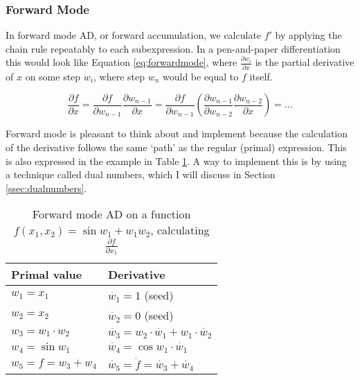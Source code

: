 \documentclass{article}
\begin{document}
            \subsubsection{Forward Mode}
                In forward mode AD, or forward accumulation, we calculate $f'$ by applying the chain rule repeatably to each subexpression.
                In a pen-and-paper differentiation this would look like Equation \ref{eq:forwardmode}, where $\tfrac{\partial w_i}{\partial x}$ is the partial derivative of $x$ on some step $w_i$, where step $w_n$ would be equal to $f$ itself.

                \begin{equation} \label{eq:forwardmode}
                    \frac{\partial f}{\partial x}=\frac{\partial f}{\partial w_{n-1}}\frac{\partial w_{n-1}}{\partial x}=\frac{\partial f}{\partial w_{n-1}}\left(\frac{\partial w_{n-1}}{\partial w_{n-2}}\frac{\partial w_{n-2}}{\partial x}\right)=\dots
                \end{equation}

                Forward mode is pleasant to think about and implement because the calculation of the derivative follows the same `path' as the regular (primal) expression.
                This is also expressed in the example in Table \ref{tab:forward}.
                A way to implement this is by using a technique called dual numbers, which I will discuss in Section \ref{ssec:dualnumbers}.
                
                \begin{table}
                    \centering
                    \begin{tabular}[hbtp]{|l|l|}
                        \hline
                        Primal value & Derivative \\
                        \hline
                        $w_1=x_1$ & $\dot{w_1}=1$ (seed)\\
                        $w_2=x_2$ & $\dot{w_2}=0$ (seed)\\
                        $w_3=w_1\cdot w_2$ & $\dot{w_3}=w_2\cdot\dot{w_1}+w_1\cdot\dot{w_2}$ \\
                        $w_4=\sin w_1$ & $\dot{w_4}=\cos w_1\cdot\dot{w_1}$ \\
                        $w_5=f=w_3+w_4$ & $\dot{w_5}=\dot{f}=\dot{w_3}+\dot{w_4}$ \\
                        \hline
                    \end{tabular}
                    \caption{Forward mode AD on a function $f(x_1,x_2)=\sin w_1+w_1w_2$, calculating $\tfrac{\partial f}{\partial x_1}$}
                    \label{tab:forward}
                \end{table}
\end{document}
